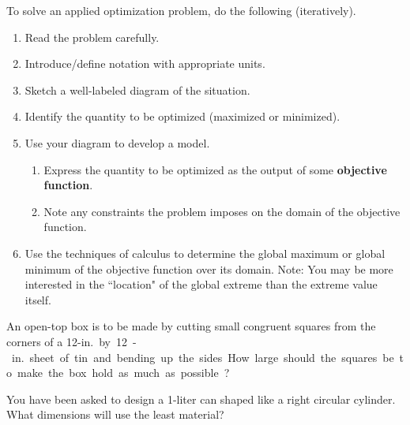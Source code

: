 \setcounter{chapter}{4}
\setcounter{section}{5}
\setcounter{theorem}{0}
\setcounter{equation}{0}


\begin{remark}
To solve an applied optimization problem, do the following (iteratively).
\begin{enumerate}
\item Read the problem carefully.
\item Introduce/define notation with appropriate units.
\item Sketch a well-labeled diagram of the situation.
\item Identify the quantity to be optimized (maximized or minimized).
\item Use your diagram to develop a model.
\begin{enumerate}
\item Express the quantity to be optimized as the output of some \textbf{objective function}.
\item Note any constraints the problem imposes on the domain of the objective function.
\end{enumerate}
\item Use the techniques of calculus to determine the global maximum or global minimum of the objective function over its domain.
Note: You may be more interested in the ``location" of the global extreme than the extreme value itself.
\end{enumerate}
\end{remark}

\begin{example}
An open-top box is to be made by cutting small congruent squares from the corners of a 12-\si{in.} by 12-\si{in.} sheet of tin and bending up the sides.
How large should the squares be to make the box hold as much as possible?
\end{example}

\newpage

\begin{example}
You have been asked to design a 1-liter can shaped like a right circular cylinder.
What dimensions will use the least material?
\end{example}

\newpage


